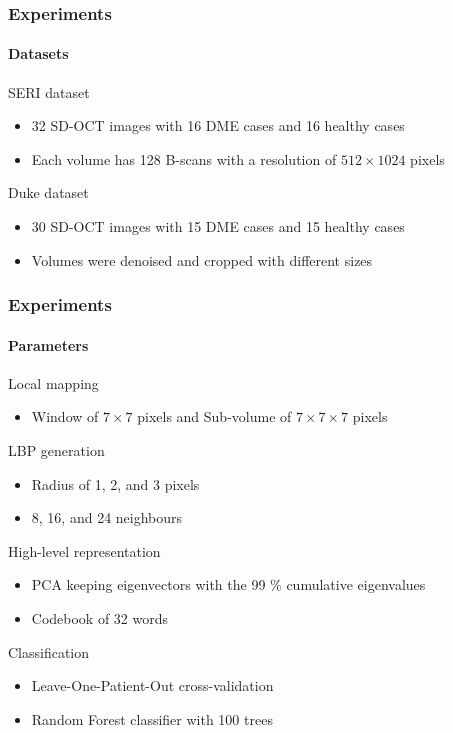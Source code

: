 \documentclass{beamer}
\begin{document}
\begin{frame}
  \frametitle{Experiments}
  \framesubtitle{Datasets}
  \begin{block}{SERI dataset}\footnotesize
    \begin{itemize}
    \item 32 SD-OCT images with 16 DME cases and 16 healthy cases
    \item Each volume has 128 B-scans with a resolution of $512 \times 1024$ pixels
    \end{itemize}
  \end{block}
  \begin{block}{Duke dataset}
    \begin{itemize}\footnotesize
    \item 30 SD-OCT images with 15 DME cases and 15 healthy cases
    \item Volumes were denoised and cropped with different sizes
    \end{itemize}
  \end{block}
\end{frame}

\begin{frame}
  \frametitle{Experiments}
  \framesubtitle{Parameters}
  \begin{block}{\footnotesize Local mapping}\footnotesize
    \begin{itemize}
    \item Window of $7 \times 7$ pixels and Sub-volume of $7 \times 7 \times 7$ pixels
    \end{itemize}
  \end{block}
  \begin{block}{\footnotesize LBP generation}\footnotesize
    \begin{itemize}
    \item Radius of 1, 2, and 3 pixels
    \item 8, 16, and 24 neighbours
    \end{itemize}
  \end{block}
  \begin{block}{\footnotesize High-level representation}\footnotesize
    \begin{itemize}
    \item PCA keeping eigenvectors with the 99 \% cumulative eigenvalues
    \item Codebook of 32 words
    \end{itemize}
  \end{block}
  \begin{block}{\footnotesize Classification}\footnotesize
    \begin{itemize}
    \item Leave-One-Patient-Out cross-validation 
    \item Random Forest classifier with 100 trees
    \end{itemize}
  \end{block}
\end{frame}
\end{document}
